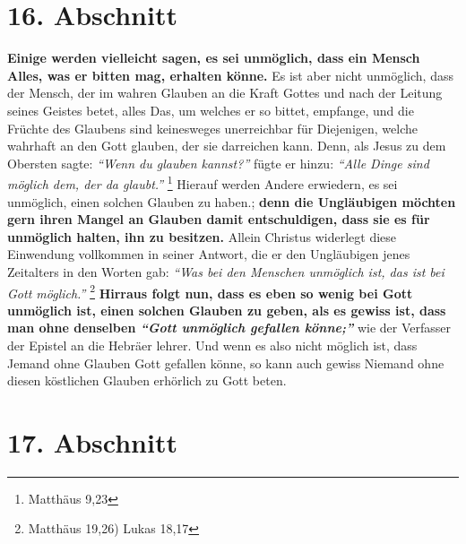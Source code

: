 \section{16. Abschnitt} \label{kap6_ab16}

\textbf{Einige werden vielleicht sagen, es sei unmöglich, dass ein Mensch Alles,
was er
bitten mag, erhalten könne.} Es ist aber nicht unmöglich, dass der Mensch, der
im
wahren Glauben an die Kraft Gottes und nach der Leitung seines Geistes betet,
alles Das, um welches er so bittet, empfange, und die Früchte des Glaubens sind
keinesweges unerreichbar für Diejenigen, welche wahrhaft an den Gott glauben,
der sie darreichen kann. Denn, als Jesus zu dem Obersten sagte:
\textit{"`Wenn du glauben kannst?"'} fügte er hinzu: \textit{"`Alle Dinge sind
möglich dem, der da glaubt."'}
\footnote{Matthäus 9,23}
Hierauf werden Andere erwiedern, es sei
unmöglich, einen solchen Glauben zu haben.; \textbf{denn die Ungläubigen möchten
gern
ihren Mangel an Glauben  damit entschuldigen, dass
sie es für unmöglich halten,
ihn zu besitzen.} Allein Christus widerlegt diese Einwendung vollkommen in
seiner
Antwort, die er den Ungläubigen jenes Zeitalters in den Worten gab:
\textit{"`Was bei den Menschen unmöglich ist, das ist bei Gott möglich."'}
\footnote{Matthäus 19,26) Lukas 18,17}
\textbf{Hirraus folgt nun, dass es eben so wenig bei Gott unmöglich
ist,
einen solchen Glauben zu geben, als es gewiss ist, dass man ohne denselben
\textit{"`Gott unmöglich gefallen könne;"'}} wie der Verfasser der Epistel an
die Hebräer
lehrer. Und wenn es also nicht möglich ist, dass Jemand ohne Glauben Gott
gefallen könne, so kann auch gewiss Niemand ohne diesen köstlichen Glauben
erhörlich zu Gott beten.

\section{17. Abschnitt} \label{kap6_ab17}

